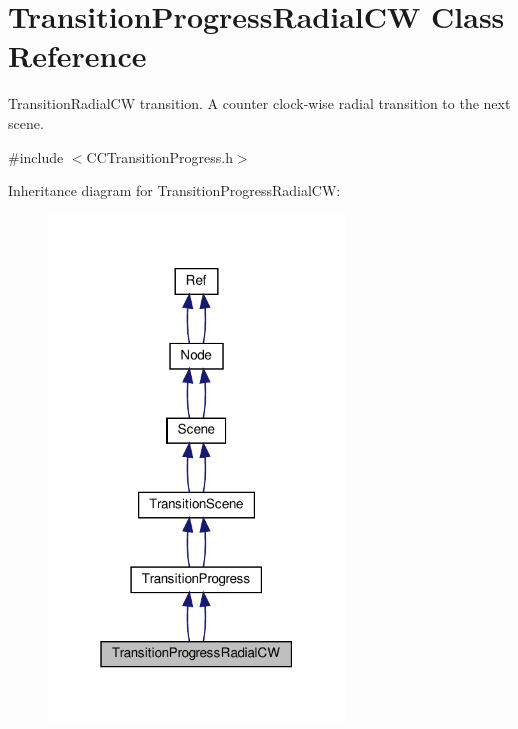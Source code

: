 \hypertarget{classTransitionProgressRadialCW}{}\section{Transition\+Progress\+Radial\+CW Class Reference}
\label{classTransitionProgressRadialCW}


Transition\+Radial\+CW transition. A counter clock-\/wise radial transition to the next scene.  




{\ttfamily \#include $<$C\+C\+Transition\+Progress.\+h$>$}



Inheritance diagram for Transition\+Progress\+Radial\+CW\+:
\nopagebreak
\begin{figure}[H]
\begin{center}
\leavevmode
\includegraphics[width=223pt]{classTransitionProgressRadialCW__inherit__graph}
\end{center}
\end{figure}


